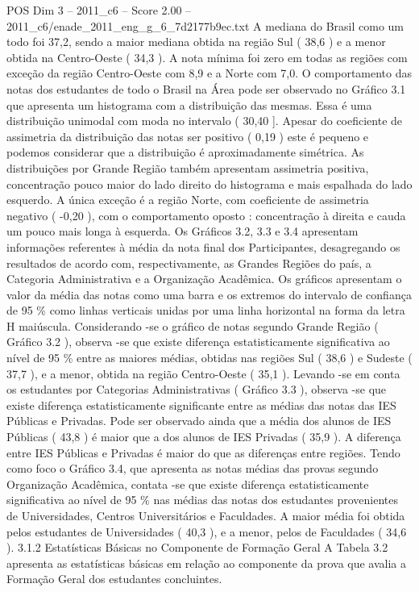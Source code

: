 \begin{textsample}{POS Dim 3 – 2011\_c6 – Score 2.00 – 2011\_c6/enade\_2011\_eng\_g\_6\_7d2177b9ec.txt}
A mediana do Brasil como um todo foi 37,2, sendo a maior mediana obtida na região Sul ( 38,6 ) e a menor obtida na Centro-Oeste ( 34,3 ).
A nota mínima foi zero em todas as regiões com exceção da região Centro-Oeste com 8,9 e a Norte com 7,0.
O comportamento das notas dos estudantes de todo o Brasil na Área pode ser observado no Gráfico 3.1 que apresenta um histograma com a distribuição das mesmas.
Essa é uma distribuição unimodal com moda no intervalo ( 30,40 ].
Apesar do coeficiente de assimetria da distribuição das notas ser positivo ( 0,19 ) este é pequeno e podemos considerar que a distribuição é aproximadamente simétrica.
As distribuições por Grande Região também apresentam assimetria positiva, concentração pouco maior do lado direito do histograma e mais espalhada do lado esquerdo.
A única exceção é a região Norte, com coeficiente de assimetria negativo ( -0,20 ), com o comportamento oposto : concentração à direita e cauda um pouco mais longa à esquerda.
Os Gráficos 3.2, 3.3 e 3.4 apresentam informações referentes à média da nota final dos Participantes, desagregando os resultados de acordo com, respectivamente, as Grandes Regiões do país, a Categoria Administrativa e a Organização Acadêmica.
Os gráficos apresentam o valor da média das notas como uma barra e os extremos do intervalo de confiança de 95 \% como linhas verticais unidas por uma linha horizontal na forma da letra H maiúscula.
Considerando -se o gráfico de notas segundo Grande Região ( Gráfico 3.2 ), observa -se que existe diferença estatisticamente significativa ao nível de 95 \% entre as maiores médias, obtidas nas regiões Sul ( 38,6 ) e Sudeste ( 37,7 ), e a menor, obtida na região Centro-Oeste ( 35,1 ).
Levando -se em conta os estudantes por Categorias Administrativas ( Gráfico 3.3 ), observa -se que existe diferença estatisticamente significante entre as médias das notas das IES Públicas e Privadas.
Pode ser observado ainda que a média dos alunos de IES Públicas ( 43,8 ) é maior que a dos alunos de IES Privadas ( 35,9 ).
A diferença entre IES Públicas e Privadas é maior do que as diferenças entre regiões.
Tendo como foco o Gráfico 3.4, que apresenta as notas médias das provas segundo Organização Acadêmica, contata -se que existe diferença estatisticamente significativa ao nível de 95 \% nas médias das notas dos estudantes provenientes de Universidades, Centros Universitários e Faculdades.
A maior média foi obtida pelos estudantes de Universidades ( 40,3 ), e a menor, pelos de Faculdades ( 34,6 ). 3.1.2 Estatísticas Básicas no Componente de Formação Geral A Tabela 3.2 apresenta as estatísticas básicas em relação ao componente da prova que avalia a Formação Geral dos estudantes concluintes.

\end{textsample}
